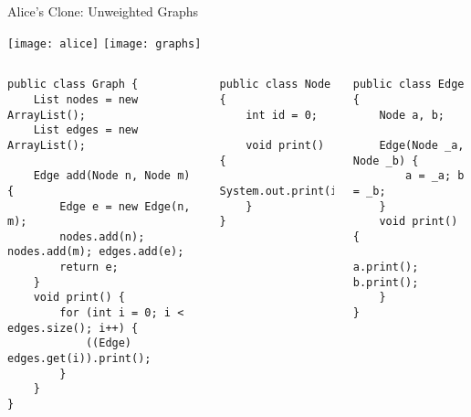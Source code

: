 \begin{frame}[fragile]{Alice's Clone: Unweighted Graphs}
	\vspace{-1.5cm}
	\begin{flushright}
		\texttt{[image: alice]}
		\texttt{[image: graphs]}
	\end{flushright}
	\begin{tiny}
		\begin{columns}
				\vspace{-3mm}				
\vspace{3mm}
\begin{lstlisting}
public class Graph {
	List nodes = new ArrayList();
	List edges = new ArrayList();

	Edge add(Node n, Node m) {
		Edge e = new Edge(n, m);
		nodes.add(n); nodes.add(m); edges.add(e);
		return e;
	}
	void print() {
		for (int i = 0; i < edges.size(); i++) {
			((Edge) edges.get(i)).print();
		}
	}
}
\end{lstlisting}
\begin{lstlisting}
public class Node {
	int id = 0;

	void print() {
		System.out.print(id);
	}
}
\end{lstlisting}
\begin{lstlisting}
public class Edge {
	Node a, b;

	Edge(Node _a, Node _b) {
		a = _a; b = _b;
	}
	void print() {
		a.print(); b.print();
	}
}
\end{lstlisting}
		\end{columns}
	\end{tiny}
\end{frame}

